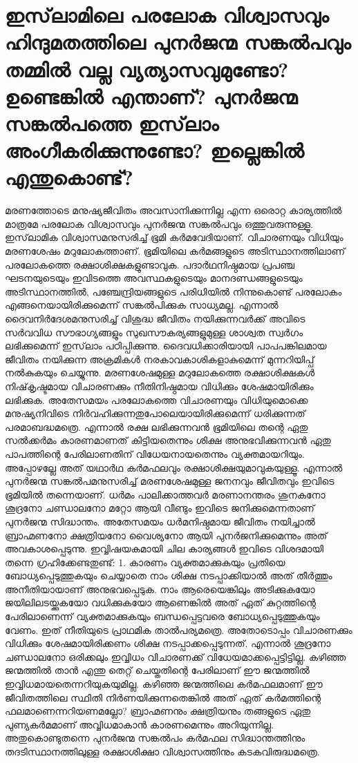   \section{ഇസ്‌ലാമിലെ പരലോക വിശ്വാസവും ഹിന്ദുമതത്തിലെ പുനര്‍ജന്മ സങ്കല്‍പവും തമ്മില്‍ വല്ല വ്യത്യാസവുമുണ്ടോ? ഉണ്ടെങ്കില്‍ എന്താണ്? പുനര്‍ജന്മ സങ്കല്‍പത്തെ ഇസ്‌ലാം അംഗീകരിക്കുന്നുണ്ടോ? ഇല്ലെങ്കില്‍ എന്തുകൊണ്ട്?}
 മരണത്തോടെ മനുഷ്യജീവിതം അവസാനിക്കുന്നില്ല എന്ന ഒരൊറ്റ കാര്യത്തില്‍ മാത്രമേ പരലോക വിശ്വാസവും പുനര്‍ജന്മ സങ്കല്‍പവും ഒത്തുവരുന്നുള്ളൂ. ഇസ്‌ലാമിക വിശ്വാസമനുസരിച്ച് ഭൂമി കര്‍മവേദിയാണ്. വിചാരണയും വിധിയും മരണശേഷം മറുലോകത്താണ്. ഭൂമിയിലെ കര്‍മങ്ങളുടെ അടിസ്ഥാനത്തിലാണ് പരലോകത്തെ രക്ഷാശിക്ഷകളുണ്ടാവുക. പദാര്‍ഥനിഷ്ഠമായ പ്രപഞ്ച ഘടനയുടെയും ഇവിടത്തെ അവസ്ഥകളുടെയും മാനദണ്ഡങ്ങളുടെയും അടിസ്ഥാനത്തില്‍, പഞ്ചേന്ദ്രിയങ്ങളുടെ പരിധിയില്‍ നിന്നുകൊണ്ട് പരലോകം എങ്ങനെയായിരിക്കുമെന്ന് സങ്കല്‍പിക്കുക സാധ്യമല്ല. എന്നാല്‍ ദൈവനിര്‍ദേശമനുസരിച്ച് വിശുദ്ധ ജീവിതം നയിക്കുന്നവര്‍ക്ക് അവിടെ സര്‍വവിധ സൗഭാഗ്യങ്ങളും സുഖസൗകര്യങ്ങളുമുള്ള ശാശ്വത സ്വര്‍ഗം ലഭിക്കുമെന്ന് ഇസ്‌ലാം പഠിപ്പിക്കുന്നു. ദൈവധിക്കാരിയായി പാപപങ്കിലമായ ജീവിതം നയിക്കുന്ന അക്രമികള്‍ നരകാവകാശികളാകുമെന്ന് മുന്നറിയിപ്പ് നല്‍കുകയും ചെയ്യുന്നു. മരണശേഷമുള്ള മറുലോകത്തെ രക്ഷാശിക്ഷകള്‍ നിഷ്‌കൃഷ്ടമായ വിചാരണക്കും നീതിനിഷ്ഠമായ വിധിക്കും ശേഷമായിരിക്കും ലഭിക്കുക. അതേസമയം പരലോകത്തെ വിചാരണയും വിധിയുമൊക്കെ മനുഷ്യനിവിടെ നിര്‍വഹിക്കുന്നതുപോലെയായിരിക്കുമെന്ന് ധരിക്കുന്നത് പരമാബദ്ധമത്രെ. എന്നാല്‍ രക്ഷ ലഭിക്കുന്നവന്‍ ഭൂമിയിലെ തന്റെ ഏതു സല്‍ക്കര്‍മം കാരണമാണത് കിട്ടിയതെന്നും ശിക്ഷ അനുഭവിക്കുന്നവന്‍ ഏതു പാപത്തിന്റെ പേരിലാണതിന് വിധേയനായതെന്നും വ്യക്തമായറിയും. അപ്പോഴല്ലേ അത് യഥാര്‍ഥ കര്‍മഫലവും രക്ഷാശിക്ഷയുമാവുകയുള്ളൂ.
എന്നാല്‍ പുനര്‍ജന്മ സങ്കല്‍പമനുസരിച്ച് മരണശേഷമുള്ള ജനനവും ജീവിതവും ഇവിടെ ഭൂമിയില്‍ തന്നെയാണ്. ധര്‍മം പാലിക്കാത്തവര്‍ മരണാനന്തരം ശുനകനോ ശൂദ്രനോ ചണ്ഡാലനോ മറ്റോ ആയി വീണ്ടും ഇവിടെ ജനിക്കുമെന്നതാണ് പുനര്‍ജന്മ സിദ്ധാന്തം. അതേസമയം ധര്‍മനിഷ്ഠമായ ജീവിതം നയിച്ചാല്‍ ബ്രാഹ്മണനോ ക്ഷത്രിയനോ വൈശ്യനോ ആയി പുനര്‍ജനിക്കുമെന്നും അത് അവകാശപ്പെടുന്നു. ഇവ്വിഷയകമായി ചില കാര്യങ്ങള്‍ ഇവിടെ വിശദമായി തന്നെ ഗ്രഹിക്കേണ്ടതുണ്ട്:
1. കാരണം വ്യക്തമാക്കുകയും പ്രതിയെ ബോധ്യപ്പെടുത്തുകയും ചെയ്യാതെ നാം ശിക്ഷ നടപ്പാക്കിയാല്‍ അത് തീര്‍ത്തും അനീതിയായാണ് അനുഭവപ്പെടുക. നാം ആരെയെങ്കിലും അടിക്കുകയോ ജയിലിലടയ്ക്കുകയോ വധിക്കുകയോ ആണെങ്കില്‍ അത് ഏത് കുറ്റത്തിന്റെ പേരിലാണെന്ന് വ്യക്തമാക്കുകയും ബന്ധപ്പെട്ടവരെ ബോധ്യപ്പെടുത്തുകയും വേണം. ഇത് നീതിയുടെ പ്രാഥമിക താല്‍പര്യമത്രെ. അതോടൊപ്പം വിചാരണക്കും വിധിക്കും ശേഷമായിരിക്കണം ശിക്ഷ നടപ്പാക്കപ്പെടുന്നത്. എന്നാല്‍ ശൂദ്രനോ ചണ്ഡാലനോ ഒരിക്കലും ഇവ്വിധം വിചാരണക്ക് വിധേയമാക്കപ്പെട്ടിട്ടില്ല. കഴിഞ്ഞ ജന്മത്തില്‍ താന്‍ എന്തു തെറ്റ് ചെയ്തതിന്റെ പേരിലാണ് ഈ ജന്മത്തില്‍ ഇവ്വിധമായതെന്നറിയുകയുമില്ല. കഴിഞ്ഞ ജന്മത്തിലെ കര്‍മഫലമാണ് ഈ ജീവിതത്തിലെ സ്ഥിതി നിര്‍ണയിക്കുന്നതെങ്കില്‍ അത് ഏത് കര്‍മത്തിന്റെ ഫലമാണെന്നറിയണമല്ലോ? ബ്രാഹ്മണനും ക്ഷത്രിയനും തങ്ങളുടെ ഏതു പുണ്യകര്‍മമാണ് അവ്വിധമാകാന്‍ കാരണമെന്നും അറിയുന്നില്ല. അതുകൊണ്ടുതന്നെ പുനര്‍ജന്മ സങ്കല്‍പം കര്‍മഫല സിദ്ധാന്തത്തിനും തദടിസ്ഥാനത്തിലുള്ള രക്ഷാശിക്ഷാ വിശ്വാസത്തിനും കടകവിരുദ്ധമത്രെ.\\
